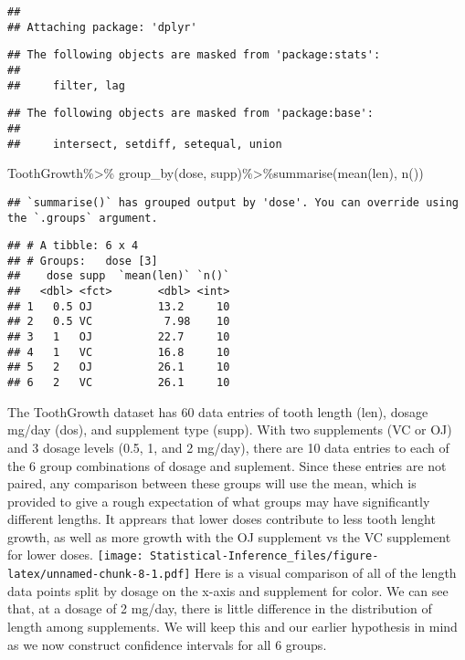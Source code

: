 \documentclass[
]{article}
\newenvironment{Shaded}{\begin{snugshade}}{\end{snugshade}}
\newcommand{\FunctionTok}[1]{\textcolor[rgb]{0.00,0.00,0.00}{#1}}
\newcommand{\NormalTok}[1]{#1}
\newcommand{\SpecialCharTok}[1]{\textcolor[rgb]{0.00,0.00,0.00}{#1}}
\begin{document}
\begin{verbatim}
## 
## Attaching package: 'dplyr'
\end{verbatim}

\begin{verbatim}
## The following objects are masked from 'package:stats':
## 
##     filter, lag
\end{verbatim}

\begin{verbatim}
## The following objects are masked from 'package:base':
## 
##     intersect, setdiff, setequal, union
\end{verbatim}

\begin{Shaded}
\begin{Highlighting}[]
\NormalTok{ToothGrowth}\SpecialCharTok{\%\textgreater{}\%} \FunctionTok{group\_by}\NormalTok{(dose, supp)}\SpecialCharTok{\%\textgreater{}\%}\FunctionTok{summarise}\NormalTok{(}\FunctionTok{mean}\NormalTok{(len), }\FunctionTok{n}\NormalTok{())}
\end{Highlighting}
\end{Shaded}

\begin{verbatim}
## `summarise()` has grouped output by 'dose'. You can override using the `.groups` argument.
\end{verbatim}

\begin{verbatim}
## # A tibble: 6 x 4
## # Groups:   dose [3]
##    dose supp  `mean(len)` `n()`
##   <dbl> <fct>       <dbl> <int>
## 1   0.5 OJ          13.2     10
## 2   0.5 VC           7.98    10
## 3   1   OJ          22.7     10
## 4   1   VC          16.8     10
## 5   2   OJ          26.1     10
## 6   2   VC          26.1     10
\end{verbatim}

The ToothGrowth dataset has 60 data entries of tooth length (len),
dosage mg/day (dos), and supplement type (supp). With two supplements
(VC or OJ) and 3 dosage levels (0.5, 1, and 2 mg/day), there are 10 data
entries to each of the 6 group combinations of dosage and suplement.
Since these entries are not paired, any comparison between these groups
will use the mean, which is provided to give a rough expectation of what
groups may have significantly different lengths. It apprears that lower
doses contribute to less tooth lenght growth, as well as more growth
with the OJ supplement vs the VC supplement for lower doses.
\texttt{[image: Statistical-Inference\_files/figure-latex/unnamed-chunk-8-1.pdf]}
Here is a visual comparison of all of the length data points split by
dosage on the x-axis and supplement for color. We can see that, at a
dosage of 2 mg/day, there is little difference in the distribution of
length among supplements. We will keep this and our earlier hypothesis
in mind as we now construct confidence intervals for all 6 groups.
\end{document}
